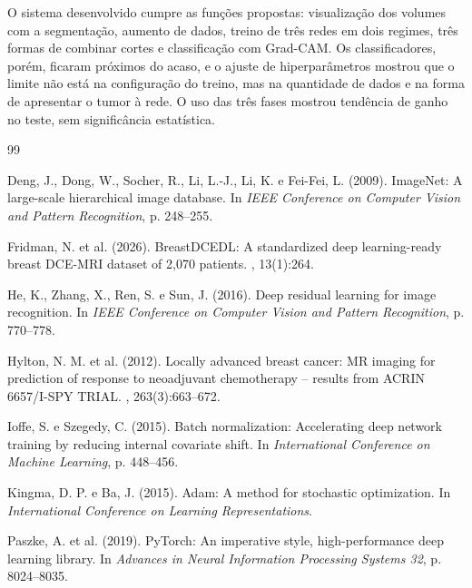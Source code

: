 \documentclass[12pt]{article}
\begin{document}
O sistema desenvolvido cumpre as funções propostas: visualização dos volumes com a segmentação, aumento
de dados, treino de três redes em dois regimes, três formas de combinar cortes e classificação com
Grad-CAM. Os classificadores, porém, ficaram próximos do acaso, e o ajuste de hiperparâmetros mostrou que
o limite não está na configuração do treino, mas na quantidade de dados e na forma de apresentar o tumor
à rede. O uso das três fases mostrou tendência de ganho no teste, sem significância estatística.

\begin{thebibliography}{99}

Deng, J., Dong, W., Socher, R., Li, L.-J., Li, K. e Fei-Fei, L. (2009).
\newblock ImageNet: A large-scale hierarchical image database.
\newblock In {\em IEEE Conference on Computer Vision and Pattern Recognition}, p. 248--255.

Fridman, N. et al. (2026).
\newblock BreastDCEDL: A standardized deep learning-ready breast DCE-MRI dataset of 2,070 patients.
, 13(1):264.

He, K., Zhang, X., Ren, S. e Sun, J. (2016).
\newblock Deep residual learning for image recognition.
\newblock In {\em IEEE Conference on Computer Vision and Pattern Recognition}, p. 770--778.

Hylton, N. M. et al. (2012).
\newblock Locally advanced breast cancer: MR imaging for prediction of response to neoadjuvant
  chemotherapy -- results from ACRIN 6657/I-SPY TRIAL.
, 263(3):663--672.

Ioffe, S. e Szegedy, C. (2015).
\newblock Batch normalization: Accelerating deep network training by reducing internal covariate shift.
\newblock In {\em International Conference on Machine Learning}, p. 448--456.

Kingma, D. P. e Ba, J. (2015).
\newblock Adam: A method for stochastic optimization.
\newblock In {\em International Conference on Learning Representations}.

Paszke, A. et al. (2019).
\newblock PyTorch: An imperative style, high-performance deep learning library.
\newblock In {\em Advances in Neural Information Processing Systems 32}, p. 8024--8035.


\end{thebibliography}
\end{document}
